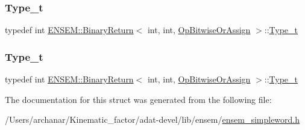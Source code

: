 \mbox{\label{structENSEM_1_1BinaryReturn_3_01int_00_01int_00_01OpBitwiseOrAssign_01_4_a39b11e165103fedd3dd7ec8e4ef89d93}} 
\subsubsection{\texorpdfstring{Type\_t}{Type\_t}\hspace{0.1cm}{\footnotesize\ttfamily [2/3]}}
{\footnotesize\ttfamily typedef int \mbox{\hyperlink{structENSEM_1_1BinaryReturn}{E\+N\+S\+E\+M\+::\+Binary\+Return}}$<$ int, int, \mbox{\hyperlink{structENSEM_1_1OpBitwiseOrAssign}{Op\+Bitwise\+Or\+Assign}} $>$\+::\mbox{\hyperlink{structENSEM_1_1BinaryReturn_3_01int_00_01int_00_01OpBitwiseOrAssign_01_4_a39b11e165103fedd3dd7ec8e4ef89d93}{Type\+\_\+t}}}

\mbox{\label{structENSEM_1_1BinaryReturn_3_01int_00_01int_00_01OpBitwiseOrAssign_01_4_a39b11e165103fedd3dd7ec8e4ef89d93}} 
\subsubsection{\texorpdfstring{Type\_t}{Type\_t}\hspace{0.1cm}{\footnotesize\ttfamily [3/3]}}
{\footnotesize\ttfamily typedef int \mbox{\hyperlink{structENSEM_1_1BinaryReturn}{E\+N\+S\+E\+M\+::\+Binary\+Return}}$<$ int, int, \mbox{\hyperlink{structENSEM_1_1OpBitwiseOrAssign}{Op\+Bitwise\+Or\+Assign}} $>$\+::\mbox{\hyperlink{structENSEM_1_1BinaryReturn_3_01int_00_01int_00_01OpBitwiseOrAssign_01_4_a39b11e165103fedd3dd7ec8e4ef89d93}{Type\+\_\+t}}}



The documentation for this struct was generated from the following file\+:\begin{DoxyCompactItemize}
\item 
/\+Users/archanar/\+Kinematic\+\_\+factor/adat-\/devel/lib/ensem/\mbox{\hyperlink{adat-devel_2lib_2ensem_2ensem__simpleword_8h}{ensem\+\_\+simpleword.\+h}}\end{DoxyCompactItemize}
